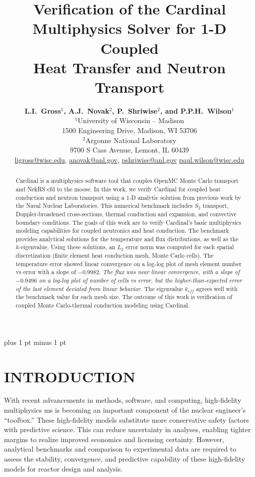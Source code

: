 \documentclass[letterpaper]{mc2023}
\title{Verification of the Cardinal Multiphysics Solver for 1-D Coupled\\
Heat Transfer and Neutron Transport}
\author{%
  \textbf{L.I.~Gross$^1$, A.J.~Novak$^2$, P.~Shriwise$^2$, and P.P.H.~Wilson$^1$}\\
  $^1$University of Wisconsin -- Madison  \\
  1500 Engineering Drive, Madison, WI 53706 \vspace{6pt}\\
  $^2$Argonne National Laboratory \\
  9700 S Cass Avenue, Lemont, IL 60439\vspace{6pt} \\
  \url{ligross@wisc.edu}, \url{anovak@anl.gov}, \url{pshriwise@anl.gov} \url{paul.wilson@wisc.edu}
}
\begin{document}
\maketitle
\justify
\parskip 6pt plus 1 pt minus 1 pt

\begin{abstract}
  Cardinal is a multiphysics software tool that couples OpenMC Monte Carlo transport and NekRS \gls{cfd} to the \gls{moose}.
  In this work, we verify Cardinal for coupled heat conduction and neutron transport using a 1-D analytic solution from previous
  work by the Naval Nuclear Laboratories. This numerical benchmark includes $S_2$ transport, Doppler-broadened cross-sections,
  thermal conduction and expansion, and convective boundary conditions. The goals of this work are to verify Cardinal's basic
  multiphysics modeling capabilities for coupled neutronics and heat conduction. The benchmark provides analytical solutions for
  the temperature and flux distributions, as well as the $k$-eigenvalue. Using these solutions, an $L_{2}$ error norm was computed
  for each spatial discretization (finite element heat conduction mesh, Monte Carlo cells). The temperature error showed linear
  convergence on a log-log plot of mesh element number vs error with a slope of $-0.9982$. \textit{The flux was near linear convergence,
  with a slope of  $-0.9496$ on a log-log plot of number of cells vs error, but the higher-than-expected error of the last
  element deviated from linear behavior.}
  The eigenvalue $k_{eff}$ agrees well with the benchmark value for each mesh size. The outcome of this work is verification of coupled
  Monte Carlo-thermal conduction modeling using Cardinal.
\end{abstract}
\vspace{6pt}

\section{INTRODUCTION}
\label{sec:intro}
With recent advancements in methods, software, and computing, high-fidelity multiphysics \gls{ms} is becoming an important
component of the nuclear engineer's ``toolbox.'' These high-fidelity models substitute more conservative safety factors
with predictive science. This can reduce uncertainty in analyses, enabling tighter margins to realize improved economics
and licensing certainty. However, analytical benchmarks and comparison to experimental data are required to assess the stability,
convergence, and predictive capability of these high-fidelity models for reactor design and analysis.
\end{document}
